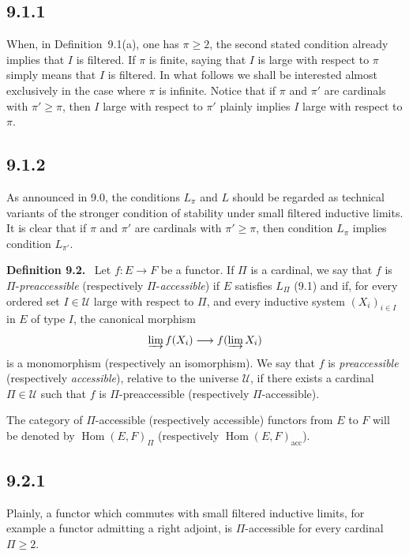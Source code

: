 \documentclass[11pt]{article}
\newcommand{\U}{\mathcal{U}}
\newcommand{\Hhom}{\operatorname{Hom}}
\newcommand{\acc}{\mathrm{acc}}
\newenvironment{statement}[1]{\par\medskip\noindent\textbf{#1.}\ }{\par\medskip}
\begin{document}
\subsection*{9.1.1}
When, in Definition~9.1(a), one has $\pi\geq 2$, the second stated condition already implies that $I$ is filtered. If $\pi$ is finite, saying that $I$ is large with respect to $\pi$ simply means that $I$ is filtered. In what follows we shall be interested almost exclusively in the case where $\pi$ is infinite. Notice that if $\pi$ and $\pi'$ are cardinals with $\pi'\geq \pi$, then $I$ large with respect to $\pi'$ plainly implies $I$ large with respect to $\pi$.

\subsection*{9.1.2}
As announced in 9.0, the conditions $L_\pi$ and $L$ should be regarded as technical variants of the stronger condition of stability under small filtered inductive limits. It is clear that if $\pi$ and $\pi'$ are cardinals with $\pi'\geq \pi$, then condition $L_\pi$ implies condition $L_{\pi'}$.

\begin{statement}{Definition 9.2}
Let $f:E\to F$ be a functor. If $\Pi$ is a cardinal, we say that $f$ is $\Pi$-\emph{preaccessible} (respectively $\Pi$-\emph{accessible}) if $E$ satisfies $L_\Pi$ (9.1) and if, for every ordered set $I\in\U$ large with respect to $\Pi$, and every inductive system $(X_i)_{i\in I}$ in $E$ of type $I$, the canonical morphism
\[
 \varinjlim f(X_i)\longrightarrow f(\varinjlim X_i)
\]
is a monomorphism (respectively an isomorphism). We say that $f$ is \emph{preaccessible} (respectively \emph{accessible}), relative to the universe $\U$, if there exists a cardinal $\Pi\in\U$ such that $f$ is $\Pi$-preaccessible (respectively $\Pi$-accessible).
\end{statement}

The category of $\Pi$-accessible (respectively accessible) functors from $E$ to $F$ will be denoted by $\Hhom(E,F)_\Pi$ (respectively $\Hhom(E,F)_{\acc}$).

\subsection*{9.2.1}
Plainly, a functor which commutes with small filtered inductive limits, for example a functor admitting a right adjoint, is $\Pi$-accessible for every cardinal $\Pi\geq 2$.
\end{document}
